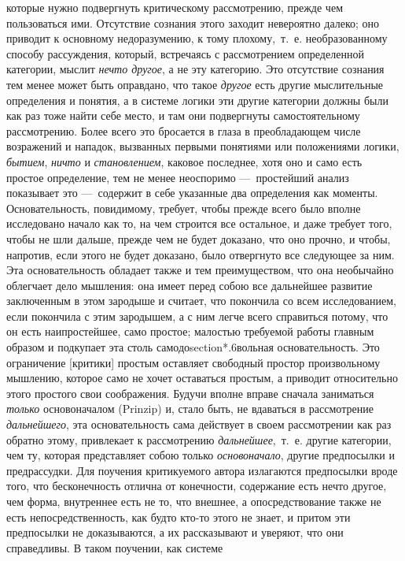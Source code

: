 которые нужно подвергнуть критическому рассмотрению, прежде чем
пользоваться ими. Отсутствие сознания этого заходит невероятно далеко; оно
приводит к основному недоразумению, к тому плохому,~т.~е. необразованному
способу рассуждения, который, встречаясь с рассмотрением определенной
категории, мыслит {\em нечто другое}, а не эту
категорию. Это отсутствие сознания тем менее может быть оправдано, что
такое {\em другое} есть другие мыслительные определения
и понятия, а в системе логики эти другие категории должны были как раз тоже
найти себе место, и там они подвергнуты самостоятельному рассмотрению.
Более всего это бросается в глаза в преобладающем числе возражений и
нападок, вызванных первыми понятиями или положениями логики,
{\em бытием}, {\em ничто} и
{\em становлением}, каковое последнее, хотя оно и само
есть простое определение, тем не менее неоспоримо —~простейший анализ
показывает это —~содержит в себе указанные два определения как моменты.
Основательность, повидимому, требует, чтобы прежде всего было вполне
исследовано начало как то, на чем строится все остальное, и даже требует
того, чтобы не шли дальше, прежде чем не будет доказано, что оно прочно, и
чтобы, напротив, если этого не будет доказано, было отвергнуто все
следующее за ним. Эта основательность обладает также и тем преимуществом,
что она необычайно облегчает дело мышления: она имеет перед собою все
дальнейшее развитие заключенным в этом зародыше и считает, что покончила со
всем исследованием, если покончила с этим зародышем, а с ним легче всего
справиться потому, что он есть наипростейшее, само простое; малостью
требуемой работы главным образом и подкупает эта столь самодоsection*.6вольная
основательность. Это ограничение [критики] простым оставляет свободный
простор произвольному мышлению, которое само не хочет оставаться простым, а
приводит относительно этого простого свои соображения. Будучи вполне вправе
сначала заниматься {\em только} основоначалом (Prinzip)
и, стало быть, не вдаваться в рассмотрение
{\em дальнейшего}, эта основательность сама действует в
своем рассмотрении как раз обратно этому, привлекает к рассмотрению
{\em дальнейшее},~т.~е. другие категории, чем ту,
которая представляет собою только {\em основоначало},
другие предпосылки и предрассудки. Для поучения критикуемого автора
излагаются предпосылки вроде того, что бесконечность отлична от конечности,
содержание есть нечто другое, чем форма, внутреннее есть не то, что
внешнее, а опосредствование также не есть непосредственность, как будто
кто-то этого не знает, и притом эти предпосылки не доказываются, а их
рассказывают и уверяют, что они справедливы. В таком поучении, как системе
